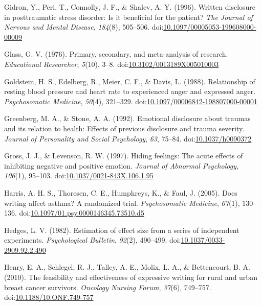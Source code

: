 \documentclass[english,man, mask]{apa6}
\theoremstyle{definition}
\theoremstyle{definition}
\theoremstyle{definition}
\theoremstyle{remark}
\begin{document}
\hypertarget{ref-Gidron1996a}{}
Gidron, Y., Peri, T., Connolly, J. F., \& Shalev, A. Y. (1996). Written
disclosure in posttraumatic stress disorder: Is it beneficial for the
patient? \emph{The Journal of Nervous and Mental Disease},
\emph{184}(8), 505--506.
doi:\href{https://doi.org/10.1097/00005053-199608000-00009}{10.1097/00005053-199608000-00009}

\hypertarget{ref-Glass1976}{}
Glass, G. V. (1976). Primary, secondary, and meta-analysis of research.
\emph{Educational Researcher}, \emph{5}(10), 3--8.
doi:\href{https://doi.org/10.3102/0013189X005010003}{10.3102/0013189X005010003}

\hypertarget{ref-Goldstein1988}{}
Goldstein, H. S., Edelberg, R., Meier, C. F., \& Davis, L. (1988).
Relationship of resting blood pressure and heart rate to experienced
anger and expressed anger. \emph{Psychosomatic Medicine}, \emph{50}(4),
321--329.
doi:\href{https://doi.org/10.1097/00006842-198807000-00001}{10.1097/00006842-198807000-00001}

\hypertarget{ref-Greenberg1992}{}
Greenberg, M. A., \& Stone, A. A. (1992). Emotional disclosure about
traumas and its relation to health: Effects of previous disclosure and
trauma severity. \emph{Journal of Personality and Social Psychology},
\emph{63}, 75--84.
doi:\href{https://doi.org/10.1037/h0090372}{10.1037/h0090372}

\hypertarget{ref-Gross1997}{}
Gross, J. J., \& Levenson, R. W. (1997). Hiding feelings: The acute
effects of inhibiting negative and positive emotion. \emph{Journal of
Abnormal Psychology}, \emph{106}(1), 95--103.
doi:\href{https://doi.org/10.1037/0021-843X.106.1.95}{10.1037/0021-843X.106.1.95}

\hypertarget{ref-Harris2005}{}
Harris, A. H. S., Thoresen, C. E., Humphreys, K., \& Faul, J. (2005).
Does writing affect asthma? A randomized trial. \emph{Psychosomatic
Medicine}, \emph{67}(1), 130--136.
doi:\href{https://doi.org/10.1097/01.psy.0000146345.73510.d5}{10.1097/01.psy.0000146345.73510.d5}

\hypertarget{ref-Hedges1982}{}
Hedges, L. V. (1982). Estimation of effect size from a series of
independent experiments. \emph{Psychological Bulletin}, \emph{92}(2),
490--499.
doi:\href{https://doi.org/10.1037/0033-2909.92.2.490}{10.1037/0033-2909.92.2.490}

\hypertarget{ref-Henry2010}{}
Henry, E. A., Schlegel, R. J., Talley, A. E., Molix, L. A., \&
Bettencourt, B. A. (2010). The feasibility and effectiveness of
expressive writing for rural and urban breast cancer survivors.
\emph{Oncology Nursing Forum}, \emph{37}(6), 749--757.
doi:\href{https://doi.org/10.1188/10.ONF.749-757}{10.1188/10.ONF.749-757}
\end{document}
